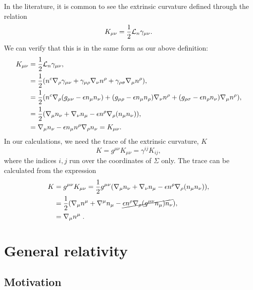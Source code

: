 In the literature, it is common to see the extrinsic curvature defined through the relation \cite{York1986}
\begin{equation}
\label{eq:extcur2}
	K_{\mu \nu} = \frac{1}{2} {\cal L}_n \gamma_{\mu \nu}.
\end{equation}
We can verify that this is in the same form as our above definition:
\begin{equation*}
\begin{aligned}
		K_{\mu \nu} &=  \frac{1}{2} {\cal L}_n \gamma_{\mu \nu}, \\
				&=  \frac{1}{2} (n^{c}\nabla_\rho \gamma_{\mu \nu} + \gamma_{\mu \rho} \nabla_\nu n^\rho + \gamma_{\rho \sigma} \nabla_\mu n^\rho), \\
				&=  \frac{1}{2} (n^{c}\nabla_\rho (g_{\mu \nu} - \epsilon n_\mu n_\nu) + (g_{\mu \rho} - \epsilon n_\mu n_\rho) \nabla_\nu n^\rho + (g_{\rho \sigma} - \epsilon n_\rho n_\nu) \nabla_\mu n^\rho), \\
				&= \frac{1}{2} (\nabla_\mu n_\nu + \nabla_\nu n_\mu - \epsilon n^\rho \nabla_\rho (n_\mu n_\nu)), \\
				&= \nabla_\mu n_\nu - \epsilon n_\mu n^\rho \nabla_\rho n_\nu= K_{\mu \nu}.
\end{aligned}
\end{equation*}
In our calculations, we need the trace of the extrinsic curvature, $K$
\begin{equation}
\label{eq:trext}	
	K = g^{\mu \nu} K_{\mu \nu} = \gamma^{ij} K_{ij},
\end{equation}
where the indices $i,j$ run over the coordinates of $\Sigma$ only. The trace can be calculated from the expression
\begin{equation}
\begin{aligned}
		K &= g^{\mu \nu} K_{\mu \nu} = \frac{1}{2} g^{\mu \nu}(\nabla_\mu n_\nu + \nabla_\nu n_\mu - \epsilon n^\rho \nabla_\rho (n_\mu n_\nu)), \\
		&= \frac{1}{2} (\nabla_\mu n^{\mu} + \nabla^\mu n_\mu - \cancel{\epsilon n^\rho \nabla_\rho (g^{\mu \nu} n_\mu) n_\nu} ), \\
		&= \nabla_\mu n^\mu \;. \label{K_as_divergence}
\end{aligned}
\end{equation}



\section{General relativity}

\subsection{Motivation}

